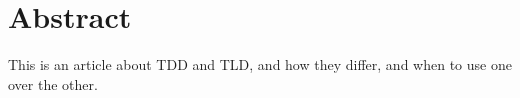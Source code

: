 \section*{Abstract}
\label{section:abstract}
This is an article about TDD and TLD, and how they differ, and when to use one over the other.



